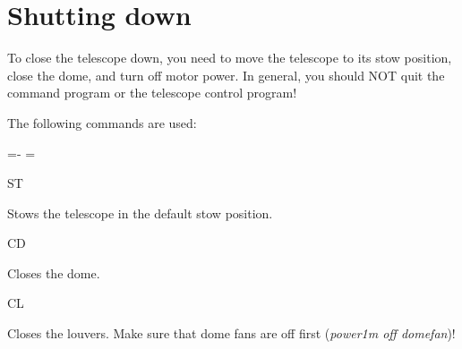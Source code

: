 \documentclass[10pt]{report}
\newenvironment{hanging}{
	\begin{list}{}{
		\labelsep=0pt
		\labelwidth=0pt
		\listparindent=0pt
		\itemindent=-\leftmargini
		\leftmargin=\leftmargini
	}
}{
	\end{list}
}
\begin{document}
\chapter{Shutting down}

To close the telescope down, you need to move the telescope to its stow
position, close the dome, and turn off motor power. In general, you should
NOT quit the command program or the telescope control program!

The following commands are used:

\begin{hanging}
%

\item{ST}

Stows the telescope in the default stow position.

\item{CD}

Closes the dome.

\item{CL}

Closes the louvers. Make sure that dome fans are off first (\textit{power1m
off domefan})!

%
%

\end{hanging}

\appendix
\end{document}
